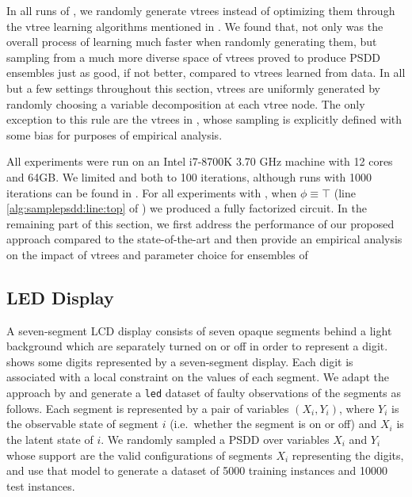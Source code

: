 In all runs of , we randomly generate vtrees instead of optimizing them
through the vtree learning algorithms mentioned in . We found that, not only
was the overall process of learning much faster when randomly generating them, but sampling from a
much more diverse space of vtrees proved to produce PSDD ensembles just as good, if not better,
compared to vtrees learned from data. In all but a few settings throughout this section, vtrees are
uniformly generated by randomly choosing a variable decomposition at each vtree node. The only
exception to this rule are the vtrees in , whose sampling is explicitly
defined with some bias for purposes of empirical analysis.

All experiments were run on an Intel i7-8700K 3.70 GHz machine with 12 cores and 64GB. We limited
 and  both to 100 iterations, although runs with 1000
iterations can be found in . For all experiments with
, when $\phi\equiv\top$ (line \ref{alg:samplepsdd:line:top} of
) we produced a fully factorized circuit. In the remaining part of this
section, we first address the performance of our proposed approach compared to the state-of-the-art
and then provide an empirical analysis on the impact of vtrees and parameter choice for ensembles
of 

\subsection{LED Display}

A seven-segment LCD display consists of seven opaque segments behind a light background which are
separately turned on or off in order to represent a digit.  shows some digits
represented by a seven-segment display. Each digit is associated with a local constraint on the
values of each segment. We adapt the approach by \citet{mattei20a} and generate a \texttt{led}
dataset of faulty observations of the segments as follows. Each segment is represented by a pair of
variables $(X_i,Y_i)$, where $Y_i$ is the observable state of segment $i$ (i.e.\ whether the
segment is on or off) and $X_i$ is the latent state of $i$. We randomly sampled a PSDD over
variables $X_i$ and $Y_i$ whose support are the valid configurations of segments $X_i$ representing
the digits, and use that model to generate a dataset of \num{5000} training instances and
\num{10000} test instances.

